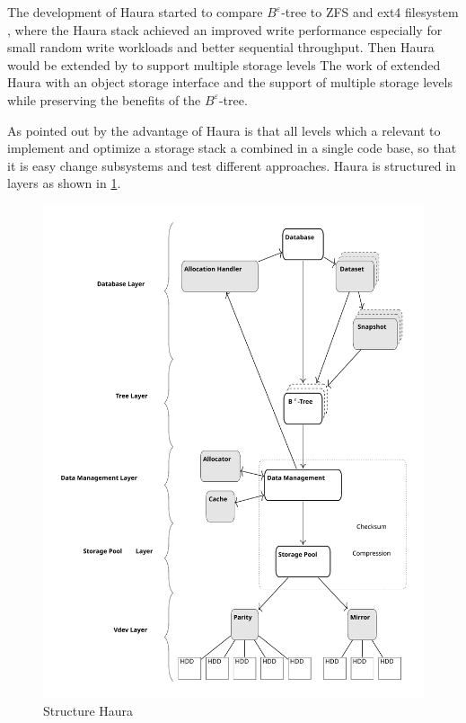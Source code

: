 \documentclass[
	12pt,
	a4paper,
	abstract,
	bibliography=totoc,
	chapterprefix,
	headings=openright,
	numbers=endperiod,
	parskip=half,
	twoside,
]{scrreprt}
\begin{document}

The development of Haura started to compare $B^{\varepsilon}$-tree to ZFS and ext4 filesystem \cite{wiedemann2018modern}, where the Haura stack
achieved an improved write performance especially for small random write workloads and better sequential throughput.
Then Haura would be extended by \cite{hoppner2021design} to support multiple storage levels
The work of \cite{hoppner2021design} extended Haura with an object storage interface and the support of multiple storage levels while preserving the benefits of the $B^{\varepsilon}$-tree.

As pointed out by \cite{wunsche2022data} the advantage of Haura is that all levels which a relevant to implement and optimize a storage stack a combined in a single code base, so that it is easy change subsystems and test different approaches.
Haura is structured in layers as shown in \cref{fig:structure Haura}.

\begin{figure}[ht]
	\centering
	\includegraphics[scale=0.4]{overview_haura_level.pdf}
	\caption{Structure Haura \cite{wiedemann2018modern}}
		\label{fig:structure Haura}
\end{figure}
\end{document}
